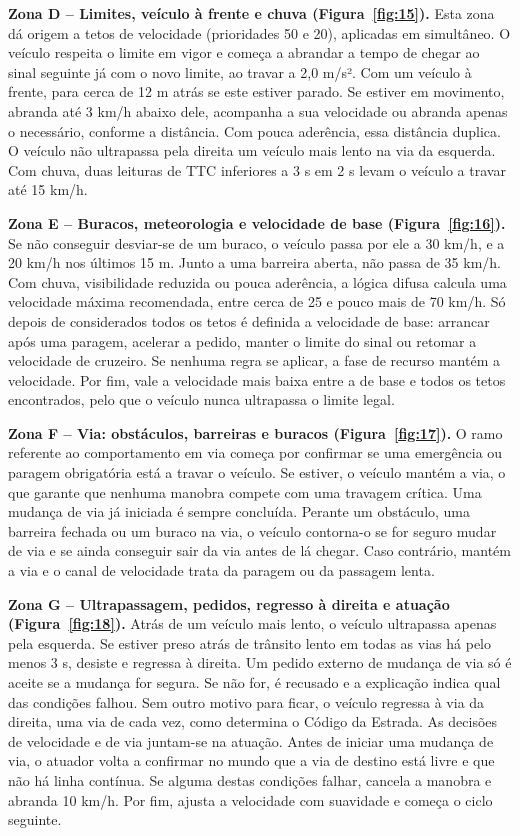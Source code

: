 \textbf{Zona D – Limites, veículo à frente e chuva (Figura~\ref{fig:15}). }Esta zona dá origem a tetos de velocidade (prioridades 50 e 20), aplicadas em simultâneo. O veículo respeita o limite em vigor e começa a abrandar a tempo de chegar ao sinal seguinte já com o novo limite, ao travar a 2,0 m/s². Com um veículo à frente, para cerca de 12 m atrás se este estiver parado. Se estiver em movimento, abranda até 3 km/h abaixo dele, acompanha a sua velocidade ou abranda apenas o necessário, conforme a distância. Com pouca aderência, essa distância duplica. O veículo não ultrapassa pela direita um veículo mais lento na via da esquerda. Com chuva, duas leituras de TTC inferiores a 3 s em 2 s levam o veículo a travar até 15 km/h.\par \textbf{Zona E – Buracos, meteorologia e velocidade de base (Figura~\ref{fig:16}). }Se não conseguir desviar-se de um buraco, o veículo passa por ele a 30 km/h, e a 20 km/h nos últimos 15 m. Junto a uma barreira aberta, não passa de 35 km/h. Com chuva, visibilidade reduzida ou pouca aderência, a lógica difusa calcula uma velocidade máxima recomendada, entre cerca de 25 e pouco mais de 70 km/h. Só depois de considerados todos os tetos é definida a velocidade de base: arrancar após uma paragem, acelerar a pedido, manter o limite do sinal ou retomar a velocidade de cruzeiro. Se nenhuma regra se aplicar, a fase de recurso mantém a velocidade. Por fim, vale a velocidade mais baixa entre a de base e todos os tetos encontrados, pelo que o veículo nunca ultrapassa o limite legal.

\textbf{Zona F – Via: obstáculos, barreiras e buracos (Figura~\ref{fig:17}). }O ramo referente ao comportamento em via começa por confirmar se uma emergência ou paragem obrigatória está a travar o veículo. Se estiver, o veículo mantém a via, o que garante que nenhuma manobra compete com uma travagem crítica. Uma mudança de via já iniciada é sempre concluída. Perante um obstáculo, uma barreira fechada ou um buraco na via, o veículo contorna-o se for seguro mudar de via e se ainda conseguir sair da via antes de lá chegar. Caso contrário, mantém a via e o canal de velocidade trata da paragem ou da passagem lenta.

\textbf{Zona G – Ultrapassagem, pedidos, regresso à direita e atuação (Figura~\ref{fig:18}). }Atrás de um veículo mais lento, o veículo ultrapassa apenas pela esquerda. Se estiver preso atrás de trânsito lento em todas as vias há pelo menos 3 s, desiste e regressa à direita. Um pedido externo de mudança de via só é aceite se a mudança for segura. Se não for, é recusado e a explicação indica qual das condições falhou. Sem outro motivo para ficar, o veículo regressa à via da direita, uma via de cada vez, como determina o Código da Estrada. As decisões de velocidade e de via juntam-se na atuação. Antes de iniciar uma mudança de via, o atuador volta a confirmar no mundo que a via de destino está livre e que não há linha contínua. Se alguma destas condições falhar, cancela a manobra e abranda 10 km/h. Por fim, ajusta a velocidade com suavidade e começa o ciclo seguinte.

